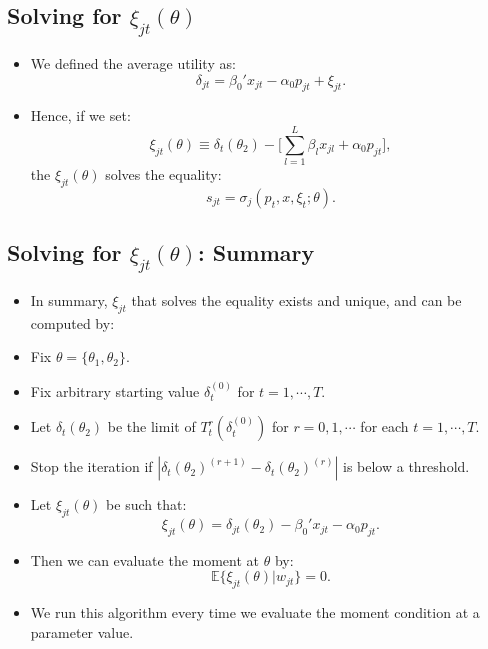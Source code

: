 \documentclass[
]{book}
\providecommand{\tightlist}{%
  \setlength{\itemsep}{0pt}\setlength{\parskip}{0pt}}
\begin{document}
\hypertarget{solving-for-xi_jttheta}{%
\subsection{\texorpdfstring{Solving for \(\xi_{jt}(\theta)\)}{Solving for \textbackslash xi\_\{jt\}(\textbackslash theta)}}\label{solving-for-xi_jttheta}}

\begin{itemize}
\tightlist
\item
  We defined the average utility as:
  \begin{equation}
  \delta_{jt} =  \beta_0' x_{jt} - \alpha_0 p_{jt} + \xi_{jt}.
  \end{equation}
\item
  Hence, if we set:
  \begin{equation}
  \xi_{jt}(\theta) \equiv \delta_t(\theta_2) - \Bigg[\sum_{l = 1}^L \beta_{l} x_{jl} + \alpha_0 p_{jt} \Bigg],
  \end{equation}
  the \(\xi_{jt}(\theta)\) solves the equality:
  \begin{equation}
  s_{jt} = \sigma_{j}(p_t, x, \xi_t; \theta).
  \end{equation}
\end{itemize}

\hypertarget{solving-for-xi_jttheta-summary}{%
\subsection{\texorpdfstring{Solving for \(\xi_{jt}(\theta)\): Summary}{Solving for \textbackslash xi\_\{jt\}(\textbackslash theta): Summary}}\label{solving-for-xi_jttheta-summary}}

\begin{itemize}
\tightlist
\item
  In summary, \(\xi_{jt}\) that solves the equality exists and unique, and can be computed by:
\item
  Fix \(\theta = \{\theta_1, \theta_2\}\).
\item
  Fix arbitrary starting value \(\delta_t^{(0)}\) for \(t = 1, \cdots, T\).
\item
  Let \(\delta_t(\theta_2)\) be the limit of \(T_t^r(\delta_t^{(0)})\) for \(r = 0, 1, \cdots\) for each \(t = 1, \cdots, T\).
\item
  Stop the iteration if \(|\delta_t(\theta_2)^{(r + 1)} - \delta_t(\theta_2)^{(r)}|\) is below a threshold.
\item
  Let \(\xi_{jt}(\theta)\) be such that:
  \begin{equation}
  \xi_{jt}(\theta) = \delta_{jt}(\theta_2) - \beta_0' x_{jt} - \alpha_0 p_{jt}.
  \end{equation}
\item
  Then we can evaluate the moment at \(\theta\) by:
  \begin{equation}
  \mathbb{E}\{\xi_{jt}(\theta)|w_{jt}\} = 0.
  \end{equation}
\item
  We run this algorithm every time we evaluate the moment condition at a parameter value.
\end{itemize}
\end{document}
